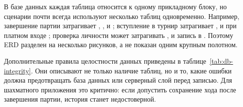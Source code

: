\normalsize



В базе данных каждая таблица относится к одному прикладному блоку, но сценарии почти всегда используют несколько таблиц одновременно. Например, завершение партии затрагивает , ,  и ; вступление в турнир затрагивает ,  и при платном входе ; проверка личности может затрагивать ,  и запись в . Поэтому ERD разделен на несколько рисунков, а не показан одним крупным полотном.

Дополнительные правила целостности данных приведены в таблице~\ref{tab:db-integrity}. Они описывают не только наличие таблиц, но и то, какие ошибки должна предотвращать база данных или серверный слой перед записью. Для шахматного приложения это критично: если допустить сохранение хода после завершения партии, история станет недостоверной.

